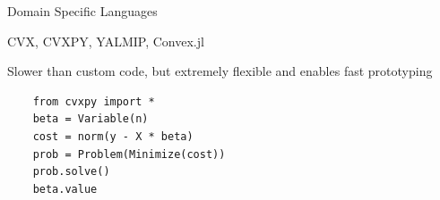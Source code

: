\documentclass{beamer}
\begin{document}
\begin{frame}[fragile]{Domain Specific Languages}
	\BIT
		\item CVX, CVXPY, YALMIP, Convex.jl
		\item Slower than custom code, but extremely flexible and enables fast prototyping
	\EIT
	
	\pause
	\begin{verbatim}
	from cvxpy import *
	beta = Variable(n)
	cost = norm(y - X * beta)
	prob = Problem(Minimize(cost))
	prob.solve()
	beta.value
	\end{verbatim}
\end{frame}

\end{document}
